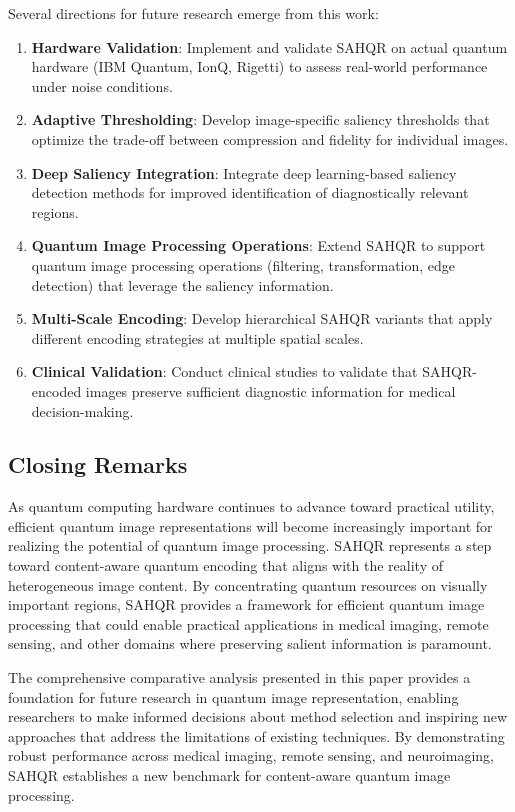 \documentclass[pdflatex,sn-mathphys-num,Numbered]{sn-jnl}
\theoremstyle{thmstyleone}
\theoremstyle{thmstyletwo}
\theoremstyle{thmstylethree}
\begin{document}
Several directions for future research emerge from this work:

\begin{enumerate}
\item \textbf{Hardware Validation}: Implement and validate SAHQR on actual quantum hardware (IBM Quantum, IonQ, Rigetti) to assess real-world performance under noise conditions.

\item \textbf{Adaptive Thresholding}: Develop image-specific saliency thresholds that optimize the trade-off between compression and fidelity for individual images.

\item \textbf{Deep Saliency Integration}: Integrate deep learning-based saliency detection methods for improved identification of diagnostically relevant regions.

\item \textbf{Quantum Image Processing Operations}: Extend SAHQR to support quantum image processing operations (filtering, transformation, edge detection) that leverage the saliency information.

\item \textbf{Multi-Scale Encoding}: Develop hierarchical SAHQR variants that apply different encoding strategies at multiple spatial scales.

\item \textbf{Clinical Validation}: Conduct clinical studies to validate that SAHQR-encoded images preserve sufficient diagnostic information for medical decision-making.
\end{enumerate}

\subsection{Closing Remarks}

As quantum computing hardware continues to advance toward practical utility, efficient quantum image representations will become increasingly important for realizing the potential of quantum image processing. SAHQR represents a step toward content-aware quantum encoding that aligns with the reality of heterogeneous image content. By concentrating quantum resources on visually important regions, SAHQR provides a framework for efficient quantum image processing that could enable practical applications in medical imaging, remote sensing, and other domains where preserving salient information is paramount.

The comprehensive comparative analysis presented in this paper provides a foundation for future research in quantum image representation, enabling researchers to make informed decisions about method selection and inspiring new approaches that address the limitations of existing techniques. By demonstrating robust performance across medical imaging, remote sensing, and neuroimaging, SAHQR establishes a new benchmark for content-aware quantum image processing.
\end{document}
